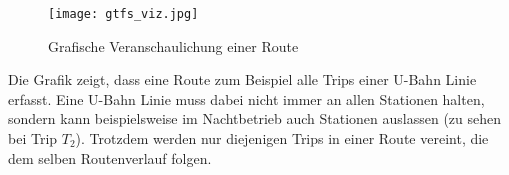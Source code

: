       \begin{figure}[htbp]
        \begin{center}
          \texttt{[image: gtfs\_viz.jpg]}
          \caption{Grafische Veranschaulichung einer Route}
          \label{fig:gtfs_viz}
        \end{center}
      \end{figure}

      Die Grafik zeigt, dass eine Route zum Beispiel alle Trips einer U-Bahn Linie erfasst. Eine U-Bahn Linie muss dabei nicht immer an allen Stationen halten, sondern kann beispielsweise im Nachtbetrieb auch Stationen auslassen (zu sehen bei Trip $T_2$). Trotzdem werden nur diejenigen Trips in einer Route vereint, die dem selben Routenverlauf folgen.

